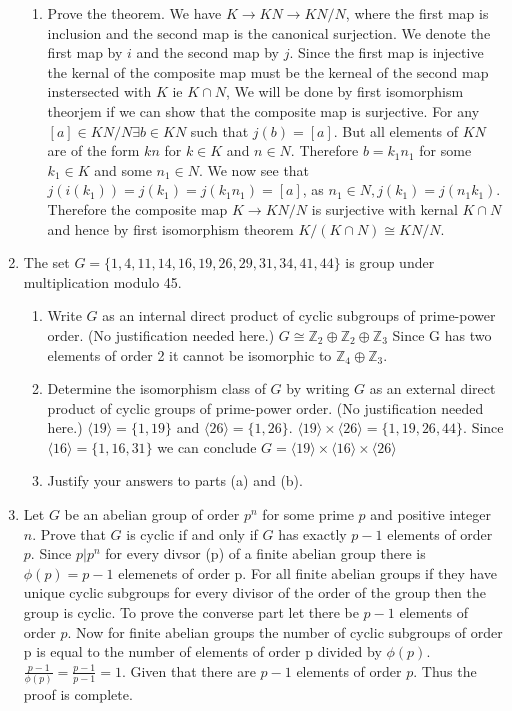 \documentclass{article}
\newcommand{\ZZ}{\mathbb{Z}}
\newcommand{\lr}[1]{\langle #1 \rangle}
\begin{document}
\begin{enumerate}
\begin{enumerate}
            \item Prove the theorem. We have $K \rightarrow KN \rightarrow KN/N$, where the first map is inclusion and the second map is the canonical surjection. We denote the first map by $i$ and the second map by $j$. Since the first map is injective the kernal of the composite map must be the kerneal of the second map instersected with $K$ ie $K \cap N$, We will be done by first isomorphism theorjem if we can show that the composite map is surjective. For any $[a] \in KN/N \exists b \in KN$ such that $j(b) = [a]$. But all elements of $KN$ are of the form $kn$ for $k \in K$ and $n \in N$. Therefore $b=k_{1}n_{1}$ for some $k_{1} \in K$ and some $n_{1} \in N$.  We now see that $j(i(k_{1})) = j(k_{1})= j(k_{1}n_{1})= [a]$, as $n_{1} \in N, j(k_{1})=j(n_{1}k_{1})$. Therefore the composite map $K \rightarrow KN/N$ is surjective with kernal $K\cap N$ and hence by first isomorphism theorem $K/(K\cap N) \cong KN/N$.

        \end{enumerate}
        
    \item The set $G=\{1,4,11,14,16,19,26,29,31,34,41,44\}$ is  group under multiplication modulo 45. 
        \begin{enumerate}
            \item Write $G$ as an internal direct product of cyclic subgroups of prime-power order. (No justification needed here.) $G \cong \ZZ_{2} \oplus \ZZ_{2} \oplus \ZZ_{3}$ Since G has two elements of order 2 it cannot be isomorphic to $\ZZ_{4} \oplus \ZZ_{3}$.
            
            \item Determine the isomorphism class of $G$ by writing $G$ as an external direct product of cyclic groups of prime-power order. (No justification needed here.) $\lr{19} = \{1,19\}$ and $\lr{26} = \{1,26\}$. $\lr{19} \times \lr{26} = \{1,19,26,44\}$. Since $\lr{16} = \{1, 16, 31\}$ we can conclude $G = \lr{19} \times \lr{16} \times \lr{26}$
            
            \item Justify your answers to parts (a) and (b).
            
        \end{enumerate}
    
    \item Let $G$ be an abelian group of order $p^n$ for some prime $p$ and positive integer $n$. Prove that $G$ is cyclic if and only if $G$ has exactly $p-1$ elements of order $p$. Since $p|p^{n}$ for every divsor (p) of a finite abelian group there is $\phi(p) = p-1$ elemenets of order p. For all finite abelian groups if they have unique cyclic subgroups for every divisor of the order of the group then the group is cyclic. To prove the converse part let there be $p-1$ elements of order $p$. Now for finite abelian groups the number of cyclic subgroups of order p is equal to the number of elements of order p divided by $\phi (p)$. $\frac{p-1}{\phi(p)}=\frac{p-1}{p-1}=1$. Given that there are $p-1$ elements of order $p$. Thus the proof is complete. 

\end{enumerate}
\end{document}

